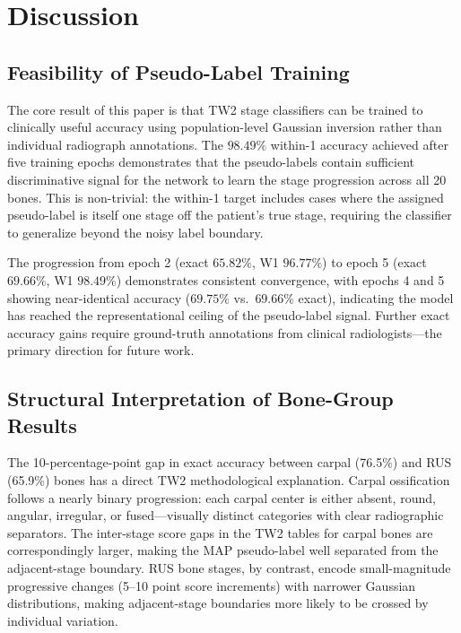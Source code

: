 \documentclass[journal]{IEEEtran}
\begin{document}
\section{Discussion}
\label{sec:discussion}

\subsection{Feasibility of Pseudo-Label Training}

The core result of this paper is that TW2 stage classifiers can be
trained to clinically useful accuracy using population-level
Gaussian inversion rather than individual radiograph annotations.
The $98.49\%$ within-1 accuracy achieved after five training
epochs demonstrates that the pseudo-labels contain sufficient
discriminative signal for the network to learn the stage progression
across all 20 bones.
This is non-trivial: the within-1 target includes cases where the
assigned pseudo-label is itself one stage off the patient's true
stage, requiring the classifier to generalize beyond the noisy
label boundary.

The progression from epoch 2 (exact $65.82\%$, W1 $96.77\%$) to
epoch 5 (exact $69.66\%$, W1 $98.49\%$) demonstrates consistent
convergence, with epochs 4 and 5 showing near-identical accuracy
($69.75\%$ vs.\ $69.66\%$ exact), indicating the model has reached
the representational ceiling of the pseudo-label signal.
Further exact accuracy gains require ground-truth annotations
from clinical radiologists—the primary direction for future work.

\subsection{Structural Interpretation of Bone-Group Results}

The 10-percentage-point gap in exact accuracy between carpal
(76.5\%) and RUS (65.9\%) bones has a direct TW2 methodological
explanation.
Carpal ossification follows a nearly binary progression: each
carpal center is either absent, round, angular, irregular, or
fused—visually distinct categories with clear radiographic
separators.
The inter-stage score gaps in the TW2 tables for carpal bones
are correspondingly larger, making the MAP pseudo-label well
separated from the adjacent-stage boundary.
RUS bone stages, by contrast, encode small-magnitude progressive
changes (5--10 point score increments) with narrower Gaussian
distributions, making adjacent-stage boundaries more likely to be
crossed by individual variation.
\end{document}
